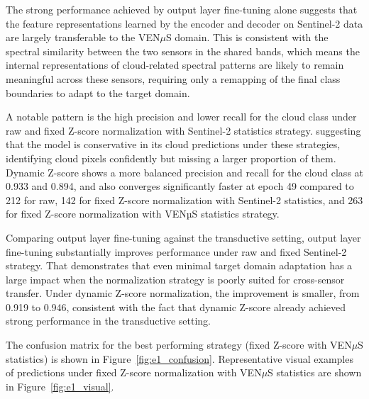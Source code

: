 The strong performance achieved by output layer fine-tuning alone suggests that the feature representations learned by the encoder and decoder on Sentinel-2 data are largely transferable to the VEN$\mu$S domain. This is consistent with the spectral similarity between the two sensors in the shared bands, which means the internal representations of cloud-related spectral patterns are likely to remain meaningful across these sensors, requiring only a remapping of the final class boundaries to adapt to the target domain.

A notable pattern is the high precision and lower recall for the cloud class under raw and fixed Z-score normalization with Sentinel-2 statistics strategy. suggesting that the model is conservative in its cloud predictions under these strategies, identifying cloud pixels confidently but missing a larger proportion of them. Dynamic Z-score shows a more balanced precision and recall for the cloud class at 0.933 and 0.894, and also converges significantly faster at epoch 49 compared to 212 for raw, 142 for fixed Z-score normalization with Sentinel-2 statistics, and 263 for fixed Z-score normalization with VENµS statistics strategy.

Comparing output layer fine-tuning against the transductive setting, output layer fine-tuning substantially improves performance under raw and fixed Sentinel-2 strategy. That demonstrates that even minimal target domain adaptation has a large impact when the normalization strategy is poorly suited for cross-sensor transfer. Under dynamic Z-score normalization, the improvement is smaller, from 0.919 to 0.946, consistent with the fact that dynamic Z-score already achieved strong performance in the transductive setting.

The confusion matrix for the best performing strategy (fixed Z-score with VEN$\mu$S statistics) is shown in Figure~\ref{fig:e1_confusion}. Representative visual examples of predictions under fixed Z-score normalization with VEN$\mu$S statistics are shown in Figure~\ref{fig:e1_visual}. 

